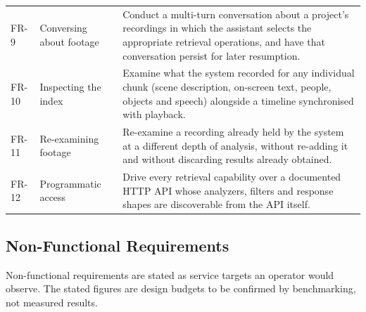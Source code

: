 \begin{table}[htbp]
\begin{tabularx}{\textwidth}{@{}lL{2.8cm}X@{}}
FR-9 & Conversing about footage & Conduct a multi-turn conversation about a project's recordings in which the assistant selects the appropriate retrieval operations, and have that conversation persist for later resumption. \\
FR-10 & Inspecting the index & Examine what the system recorded for any individual chunk (scene description, on-screen text, people, objects and speech) alongside a timeline synchronised with playback. \\
FR-11 & Re-examining footage & Re-examine a recording already held by the system at a different depth of analysis, without re-adding it and without discarding results already obtained. \\
FR-12 & Programmatic access & Drive every retrieval capability over a documented HTTP API whose analyzers, filters and response shapes are discoverable from the API itself. \\
\bottomrule
\end{tabularx}
\end{table}

\subsection{Non-Functional Requirements}

Non-functional requirements are stated as service targets an operator would observe.
The stated figures are design budgets to be confirmed by benchmarking, not measured
results.

